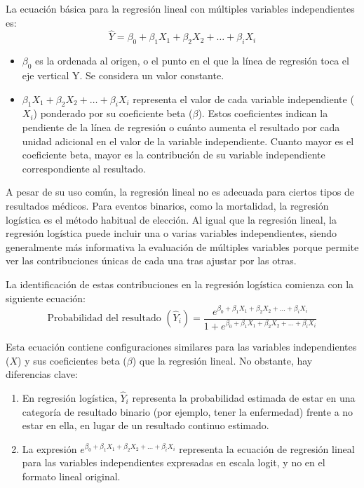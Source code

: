 \documentclass[12pt]{article}
\begin{document}
La ecuaci\'on b\'asica para la regresi\'on lineal con m\'ultiples variables independientes es:
\begin{equation}
\hat{Y} = \beta_0 + \beta_1 X_1 + \beta_2 X_2 + \ldots + \beta_i X_i
\end{equation}

\begin{itemize}
    \item $\beta_0$ es la ordenada al origen, o el punto en el que la l\'inea de regresi\'on toca el eje vertical Y. Se considera un valor constante.
    \item $\beta_1 X_1 + \beta_2 X_2 + \ldots + \beta_i X_i$ representa el valor de cada variable independiente ($X_i$) ponderado por su coeficiente beta ($\beta$). Estos coeficientes indican la pendiente de la l\'inea de regresi\'on o cu\'anto aumenta el resultado por cada unidad adicional en el valor de la variable independiente. Cuanto mayor es el coeficiente beta, mayor es la contribuci\'on de su variable independiente correspondiente al resultado.
\end{itemize}

A pesar de su uso com\'un, la regresi\'on lineal no es adecuada para ciertos tipos de resultados m\'edicos. Para eventos binarios, como la mortalidad, la regresi\'on log\'istica es el m\'etodo habitual de elecci\'on. Al igual que la regresi\'on lineal, la regresi\'on log\'istica puede incluir una o varias variables independientes, siendo generalmente m\'as informativa la evaluaci\'on de m\'ultiples variables porque permite ver las contribuciones \'unicas de cada una tras ajustar por las otras.

La identificaci\'on de estas contribuciones en la regresi\'on log\'istica comienza con la siguiente ecuaci\'on:
\begin{equation}
\text{Probabilidad del resultado } (\hat{Y}_i) = \frac{e^{\beta_0 + \beta_1 X_1 + \beta_2 X_2 + \ldots + \beta_i X_i}}{1 + e^{\beta_0 + \beta_1 X_1 + \beta_2 X_2 + \ldots + \beta_i X_i}}
\end{equation}

Esta ecuaci\'on contiene configuraciones similares para las variables independientes ($X$) y sus coeficientes beta ($\beta$) que la regresi\'on lineal. No obstante, hay diferencias clave:
\begin{enumerate}
    \item En regresi\'on log\'istica, $\hat{Y}_i$ representa la probabilidad estimada de estar en una categor\'ia de resultado binario (por ejemplo, tener la enfermedad) frente a no estar en ella, en lugar de un resultado continuo estimado.
    \item La expresi\'on $e^{\beta_0 + \beta_1 X_1 + \beta_2 X_2 + \ldots + \beta_i X_i}$ representa la ecuaci\'on de regresi\'on lineal para las variables independientes expresadas en escala logit, y no en el formato lineal original.
\end{enumerate}
\end{document}
